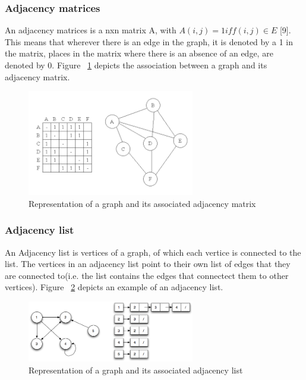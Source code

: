 \subsubsection{Adjacency matrices}
An adjacency matrices is a nxn matrix A, with $A(i,j) = 1 iff(i,j) ∈ E$ [9]. This means that wherever there is an edge in the graph, it is denoted by a 1 in the matrix, places in the matrix where there is an absence of an edge, are denoted by 0.\newline\newline
Figure ~\ref{fig:adjacencymatrix} depicts the association between a graph and its adjacency matrix.
\begin{figure}[H]
  \begin{center}
      \includegraphics[width=0.65\textwidth]{adjacencymatrix.png}
  \end{center}    
  \caption{Representation of a graph and its associated adjacency matrix}
  \label{fig:adjacencymatrix}
\end{figure}

\subsubsection{Adjacency list}
An Adjacency list is vertices of a graph, of which each vertice is connected to the list. The vertices in an adjacency list point to their own list of edges that they are connected to(i.e. the list contains the edges that connectect them to other vertices).
Figure ~\ref{fig:adjacencylist} depicts an example of an adjacency list.
\begin{figure}[H]
  \begin{center}
      \includegraphics[width=0.65\textwidth]{adjacencylist.png}
  \end{center}    
  \caption{Representation of a graph and its associated adjacency list}
  \label{fig:adjacencylist}
\end{figure}

